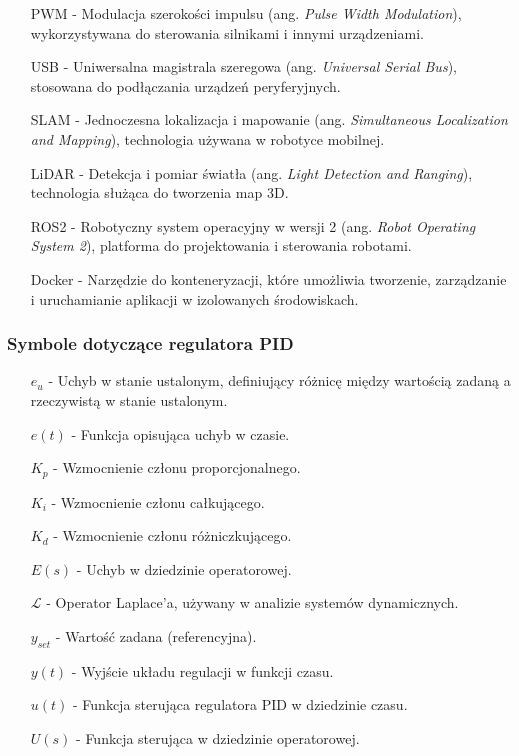 \begin{itemize}
    \item[PWM] - Modulacja szerokości impulsu (ang. \textit{Pulse Width Modulation}), wykorzystywana do sterowania silnikami i innymi urządzeniami.
    \item[USB] - Uniwersalna magistrala szeregowa (ang. \textit{Universal Serial Bus}), stosowana do podłączania urządzeń peryferyjnych.
    \item[SLAM] - Jednoczesna lokalizacja i mapowanie (ang. \textit{Simultaneous Localization and Mapping}), technologia używana w robotyce mobilnej.
    \item[LiDAR] - Detekcja i pomiar światła (ang. \textit{Light Detection and Ranging}), technologia służąca do tworzenia map 3D.
    \item[ROS2] - Robotyczny system operacyjny w wersji 2 (ang. \textit{Robot Operating System 2}), platforma do projektowania i sterowania robotami.
    \item[Docker] - Narzędzie do konteneryzacji, które umożliwia tworzenie, zarządzanie i uruchamianie aplikacji w izolowanych środowiskach. 
\end{itemize}

\subsubsection*{Symbole dotyczące regulatora PID}

\begin{itemize}
    \item[\(e_u\)] - Uchyb w stanie ustalonym, definiujący różnicę między wartością zadaną a rzeczywistą w stanie ustalonym.
    \item[\(e(t)\)] - Funkcja opisująca uchyb w czasie.
    \item[\(K_p\)] - Wzmocnienie członu proporcjonalnego.
    \item[\(K_i\)] - Wzmocnienie członu całkującego.
    \item[\(K_d\)] - Wzmocnienie członu różniczkującego.
    \item[\(E(s)\)] - Uchyb w dziedzinie operatorowej.
    \item[\(\mathcal{L}\)] - Operator Laplace’a, używany w analizie systemów dynamicznych.
    \item[\(y_{set}\)] - Wartość zadana (referencyjna).
    \item[\(y(t)\)] - Wyjście układu regulacji w funkcji czasu.
    \item[\(u(t)\)] - Funkcja sterująca regulatora PID w dziedzinie czasu.
    \item[\(U(s)\)] - Funkcja sterująca w dziedzinie operatorowej.
\end{itemize}

